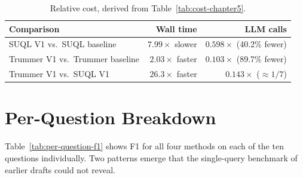 \begin{table}[h]
\centering\small
\begin{tabular}{lrr}
\toprule
Comparison & Wall time & LLM calls \\
\midrule
SUQL V1 vs.\ SUQL baseline       & $7.99\times$ slower & $0.598\times$ (40.2\% fewer) \\
Trummer V1 vs.\ Trummer baseline & $2.03\times$ faster & $0.103\times$ (89.7\% fewer) \\
Trummer V1 vs.\ SUQL V1          & $26.3\times$ faster & $0.143\times$ ($\approx 1/7$) \\
\bottomrule
\end{tabular}
\caption{Relative cost, derived from Table~\ref{tab:cost-chapter5}.}
\label{tab:cost-ratios}
\end{table}

\section{Per-Question Breakdown}
\label{sec:per-question}

Table~\ref{tab:per-question-f1} shows F1 for all four methods on each of
the ten questions individually. Two patterns emerge that the single-query
benchmark of earlier drafts could not reveal.

